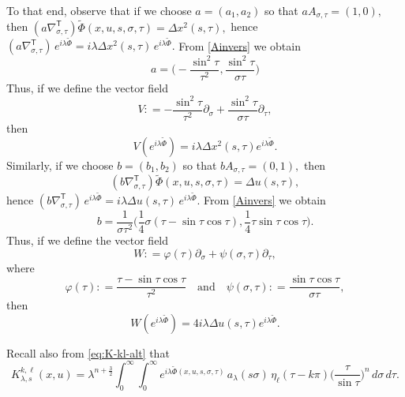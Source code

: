 \documentclass[leqno]{amsart}
\theoremstyle{definition}
\theoremstyle{remark}
\numberwithin{equation}{section}
\newcommand\la{{\lambda}}
\begin{document}
To that end, observe that if we choose $a=(a_1,a_2)$ so that $aA_{\sigma, \tau}=(1,0),$ then $(a \nabla_{\sigma,\tau}^{\mathsf T})\tilde \Phi (x,u,s,\sigma,\tau)=\Delta x^2 (s,\tau),$ hence $(a \nabla_{\sigma,\tau}^{\mathsf T})\, e^{i \lambda \tilde \Phi}=i\la \Delta x^2 (s,\tau) \, e^{i \lambda \tilde \Phi}.$ From \eqref{Ainvers} we obtain 
\[
a=\Big(-\frac {\sin^2\tau}{\tau^2}, \frac {\sin^2\tau}{\sigma \tau}\Big)
\]
Thus, if we define the vector field 
\[
V: = -\frac {\sin^2\tau}{\tau^2} \partial_{\sigma}+\frac {\sin^2\tau}{\sigma\tau}\partial_{\tau},
\]
then 
\begin{equation}\label{VPhi}
V( e^{i \lambda \tilde \Phi}) =i\la \Delta x^2 (s,\tau)e^{i \lambda \tilde \Phi}.
\end{equation}
Similarly, if we choose $b=(b_1,b_2)$ so that $bA_{\sigma, \tau}=(0,1),$ then $$(b \nabla_{\sigma,\tau}^{\mathsf T})\tilde \Phi (x,u,s,\sigma,\tau)=\Delta u (s,\tau),$$ hence $(b \nabla_{\sigma,\tau}^{\mathsf T})\, e^{i \lambda \tilde \Phi}=i\la \Delta u(s,\tau) \, e^{i \lambda \tilde \Phi}.$ From \eqref{Ainvers} we obtain 
$$
b=\frac 1 {\sigma\tau^2}\Big(\frac{1}{4}\sigma(\tau-\sin\tau\cos\tau), \frac{1}{4}\tau\sin\tau\cos\tau\Big).
$$
Thus, if we define the vector field 
\[
W: = \varphi(\tau) \partial_{\sigma} + \psi(\sigma, \tau) \partial_{\tau},
\]
where
\[
\varphi(\tau): = \frac{\tau-\sin \tau \cos \tau }{\tau^2 } \quad\text{and}\quad \psi(\sigma, \tau): = \frac{\sin \tau \cos \tau }{\sigma \tau},
\]
then 
\begin{equation}\label{WPhi}
W (e^{i \lambda  \tilde\Phi} )=4 i\la \Delta u(s,\tau)e^{i \lambda \tilde \Phi}.
\end{equation}

Recall also from \eqref{eq:K-kl-alt} that 
$$
K_{\lambda,s}^{k,\ell}(x, u) = \lambda^{n + \frac 32} \int_0^\infty \int_0^\infty e^{i\lambda\tilde \Phi(x,u,s,\sigma,\tau)} \, a_\lambda(s\sigma) \, \eta_\ell(\tau -k \pi)\Big(\frac{\tau}{\sin\tau}\Big)^n \, d\sigma \, d\tau.
$$
\end{document}
